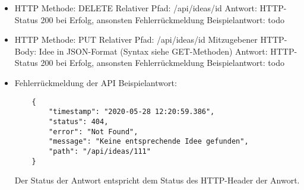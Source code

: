 \begin{itemize}
    \item HTTP Methode: DELETE
    \subitem Relativer Pfad: /api/ideas/{id}
    \subitem Antwort: HTTP-Status 200 bei Erfolg, ansonsten Fehlerrückmeldung
    \subitem Beispielantwort: todo
\end{itemize}

\begin{itemize}
    \item HTTP Methode: PUT
    \subitem Relativer Pfad: /api/ideas/{id}
    \subitem Mitzugebener HTTP-Body: Idee in JSON-Format (Syntax siehe GET-Methoden)
    \subitem Antwort: HTTP-Status 200 bei Erfolg, ansonsten Fehlerrückmeldung
    \subitem Beispielantwort: todo
\end{itemize}

\begin{itemize}
    \item Fehlerrückmeldung der API
    \subitem Beispielantwort:
    \begin{verbatim}
    {
        "timestamp": "2020-05-28 12:20:59.386",
        "status": 404,
        "error": "Not Found",
        "message": "Keine entsprechende Idee gefunden",
        "path": "/api/ideas/111"
    }
    \end{verbatim}
    \subitem Der Status der Antwort entspricht dem Status des HTTP-Header der Anwort.
\end{itemize}
